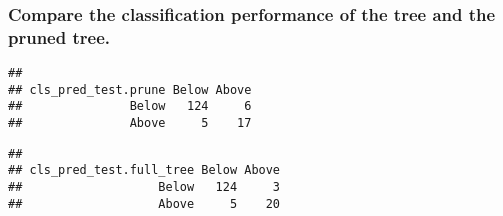 \documentclass[
]{article}
\newenvironment{Shaded}{\begin{snugshade}}{\end{snugshade}}
\newcommand{\CommentTok}[1]{\textcolor[rgb]{0.56,0.35,0.01}{\textit{#1}}}
\newcommand{\FunctionTok}[1]{\textcolor[rgb]{0.13,0.29,0.53}{\textbf{#1}}}
\newcommand{\NormalTok}[1]{#1}
\newcommand{\SpecialCharTok}[1]{\textcolor[rgb]{0.81,0.36,0.00}{\textbf{#1}}}
\begin{document}
\hypertarget{compare-the-classification-performance-of-the-tree-and-the-pruned-tree.}{%
\subsubsection{Compare the classification performance of the tree and
the pruned
tree.}\label{compare-the-classification-performance-of-the-tree-and-the-pruned-tree.}}

\begin{Shaded}
\end{Shaded}

\begin{verbatim}
##                    
## cls_pred_test.prune Below Above
##               Below   124     6
##               Above     5    17
\end{verbatim}

\begin{Shaded}
\end{Shaded}

\begin{verbatim}
##                        
## cls_pred_test.full_tree Below Above
##                   Below   124     3
##                   Above     5    20
\end{verbatim}
\end{document}

